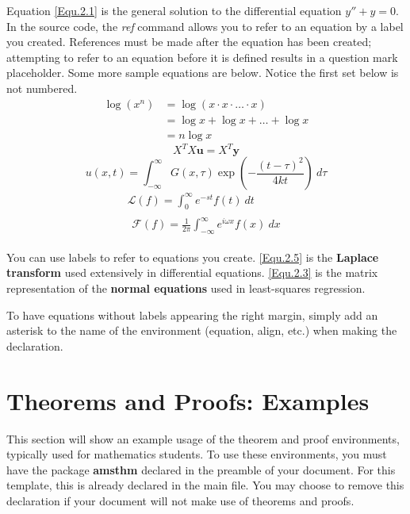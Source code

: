 Equation \ref{Equ.2.1} is the general solution to the differential equation $y''+y=0$. In the source code, the \textit{ref} command allows you to refer to an equation by a label you created. References must be made after the equation has been created; attempting to refer to an equation before it is defined results in a question mark placeholder. Some more sample equations are below. Notice the first set below is not numbered.
\begin{align*}
	\log (x^n) & = \log (x \cdot x \cdot \ldots \cdot x) \\
	           & = \log x + \log x + \ldots + \log x     \\
	           & = n \log x
\end{align*}
\begin{equation} \label{Equ.2.3}
	X^T X \mathbf{u} = X^T \mathbf{y}
\end{equation}
\begin{equation}\label{Equ.2.4}
	u(x, t) = \int_{-\infty}^{\infty} G(x, \tau) \exp\left(-\frac{(t-\tau)^2}{4kt}\right) \ d\tau
\end{equation}
\begin{gather}
	\mathcal{L}(f) = \int_{0}^{\infty} e^{-st} f(t) \ dt \\
	\begin{split} \label{Equ.2.5}
		\mathcal{F}(f) = \frac{1}{2\pi}\int_{-\infty}^{\infty} e^{i \omega x} f(x) \ dx
	\end{split}
\end{gather}

You can use labels to refer to equations you create. \ref{Equ.2.5} is the \textbf{Laplace transform} used extensively in differential equations. \ref{Equ.2.3} is the matrix representation of the \textbf{normal equations} used in least-squares regression.

To have equations without labels appearing the right margin, simply add an asterisk to the name of the environment (equation, align, etc.) when making the declaration.


\section{Theorems and Proofs: Examples}

This section will show an example usage of the theorem and proof environments, typically used for mathematics students. To use these environments, you must have the package \textbf{amsthm} declared in the preamble of your document. For this template, this is already declared in the main file. You may choose to remove this declaration if your document will not make use of theorems and proofs.

